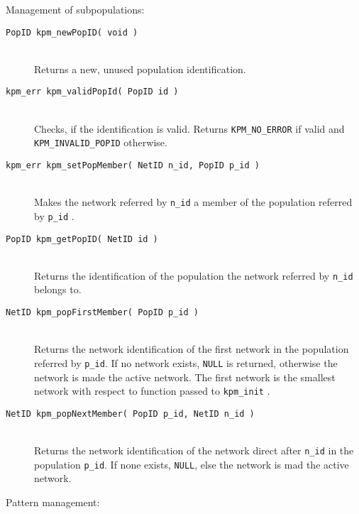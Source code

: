 Management of subpopulations:

\begin{description}
  \item[\tt PopID kpm\_newPopID( void )]~\\
	Returns a new, unused population identification.

  \item[\tt kpm\_err kpm\_validPopId( PopID id )]~\\
	Checks, if the identification is valid. Returns \verb+KPM_NO_ERROR+
 	if valid and  \verb+KPM_INVALID_POPID+ otherwise.

  \item[\tt kpm\_err kpm\_setPopMember( NetID n\_id, PopID p\_id )]~\\
	Makes the network referred by \verb+n_id+ a member of the
	population referred by \verb+p_id+ . 

  \item[\tt PopID kpm\_getPopID( NetID id )]~\\
	Returns the identification of the population the network referred by
	\verb+n_id+  belongs to.

  \item[\tt NetID kpm\_popFirstMember( PopID p\_id )]~\\
	Returns the network identification of the first network in the
	population referred by \verb+p_id+.
	If no network exists, \verb+NULL+ is returned, otherwise the network
	is made the active network.
	The first network is the smallest network with respect to  function
	passed to \verb+kpm_init+ .

  \item[\tt NetID kpm\_popNextMember( PopID p\_id, NetID n\_id )]~\\
	Returns the network identification of the network direct after
	\verb+n_id+ in the population \verb+p_id+.
	If none exists, \verb+NULL+, else the network is mad the active network.
\end{description}

Pattern management:

